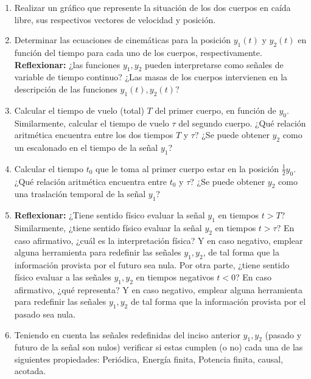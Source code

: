 \documentclass[12pt,a4paper]{report}
\begin{document}
\begin{enumerate}[label=\alph*)]
  \item Realizar un gráfico que represente la situación de los dos cuerpos en caída libre, sus respectivos vectores 
    de velocidad y posición.

  \item Determinar las ecuaciones de cinemáticas para la posición $y_1(t)$ y $y_2(t)$ en función del tiempo para cada
    uno de los cuerpos, respectivamente. \textbf{Reflexionar:} ¿las funciones $y_1, y_2$ pueden interpretarse como 
    señales de variable de tiempo continuo? ¿Las masas de los cuerpos intervienen en la descripción de las funciones
    $y_1(t),y_2(t)$?

  \item Calcular el tiempo de vuelo (total) $T$ del primer cuerpo, en función de $y_0$. Similarmente, calcular el 
    tiempo de vuelo $\tau$ del segundo cuerpo. ¿Qué relación aritmética encuentra entre los dos tiempos $T$ y $\tau$?
    ¿Se puede obtener $y_2$ como un escalonado en el tiempo de la señal $y_1$?

  \item Calcular el tiempo $t_0$ que le toma al primer cuerpo estar en la posición $\frac{1}{2} y_0$. ¿Qué relación 
    aritmética encuentra entre $t_0$ y $\tau$? ¿Se puede obtener $y_2$ como una traslación temporal de la señal $y_1$?

  \item \textbf{Reflexionar:} ¿Tiene sentido físico evaluar la señal $y_1$ en tiempos $t > T$? Similarmente, ¿tiene 
    sentido físico evaluar la señal $y_2$ en tiempos $t > \tau$? En caso afirmativo, ¿cuál es la interpretación
    física? Y en caso negativo, emplear alguna herramienta para redefinir las señales $y_1, y_2$, de tal forma que la 
    información provista por el futuro sea nula. Por otra parte, ¿tiene sentido físico evaluar a las señales $y_1,
    y_2$ en tiempos negativos $t < 0$? En caso afirmativo, ¿qué representa? Y en caso negativo, emplear alguna 
    herramienta para redefinir las señales $y_1, y_2$ de tal forma que la información provista por el pasado sea nula.

  \item Teniendo en cuenta las señales redefinidas del inciso anterior $y_1, y_2$ (pasado y futuro de la señal son
    nulos) verificar si estas cumplen (o no) cada una de las siguientes propiedades: Periódica, Energía finita, 
    Potencia finita, causal, acotada.

\end{enumerate}
\end{document}
